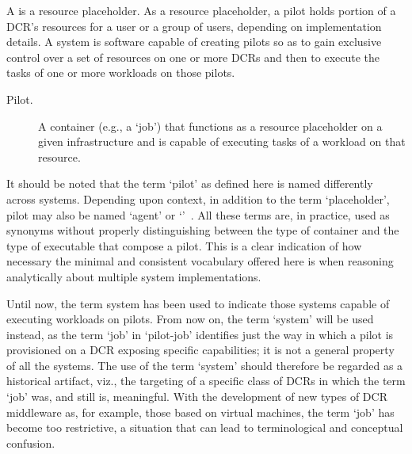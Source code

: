 \documentclass{sig-alternate}
\begin{document}

A \pilot is a resource placeholder. As a resource placeholder, a pilot holds
portion of a DCR's resources for a user or a group of users, depending on
implementation details. A \pilotjob system is software capable of creating
pilots so as to gain exclusive control over a set of resources on one or more
DCRs and then to execute the tasks of one or more workloads on those pilots.
 


\begin{description}

\item[Pilot.] A container (e.g., a `job') that functions as a resource
placeholder on a given infrastructure and is capable of executing tasks of a
workload on that resource.

\end{description}

It should be noted that the term `pilot' as defined here is named differently
across \pilotjob systems. Depending upon context, in addition to the term
`placeholder', pilot may also be named `agent' or
`\pilotjob'~\cite{moscicki2011,pinchak2002}. All these terms are, in practice,
used as synonyms without properly distinguishing between the type of container
and the type of executable that compose a pilot. This is a clear indication of
how necessary the minimal and consistent vocabulary offered here is when
reasoning analytically about multiple \pilotjob system implementations.

Until now, the term \pilotjob system has been used to indicate those systems
capable of executing workloads on pilots. From now on, the term `\pilot system'
will be used instead, as the term `job' in `pilot-job' identifies just the way
in which a pilot is provisioned on a DCR exposing specific capabilities; it is
not a general property of all the \pilotjob systems. The use of the term
`\pilotjob system' should therefore be regarded as a historical artifact, viz.,
the targeting of a specific class of DCRs in which the term `job' was, and still
is, meaningful. With the development of new types of DCR middleware as, for
example, those based on virtual machines, the term `job' has become too
restrictive, a situation that can lead to terminological and conceptual
confusion.
\end{document}
